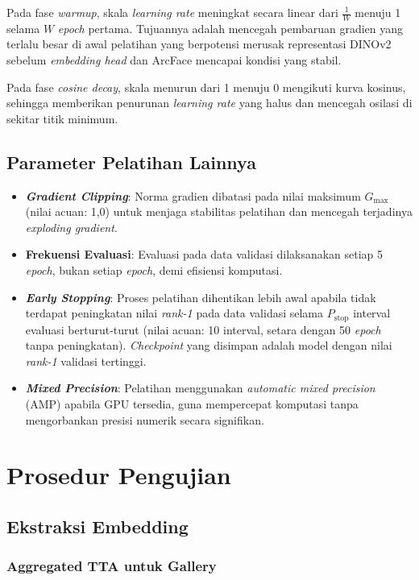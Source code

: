 Pada fase \textit{warmup}, skala \textit{learning rate} meningkat secara linear dari $\frac{1}{W}$ menuju 1 selama $W$ \textit{epoch} pertama. Tujuannya adalah mencegah pembaruan gradien yang terlalu besar di awal pelatihan yang berpotensi merusak representasi DINOv2 sebelum \textit{embedding head} dan ArcFace mencapai kondisi yang stabil.

Pada fase \textit{cosine decay}, skala menurun dari 1 menuju 0 mengikuti kurva kosinus, sehingga memberikan penurunan \textit{learning rate} yang halus dan mencegah osilasi di sekitar titik minimum.

\subsection{Parameter Pelatihan Lainnya}

\begin{itemize}
    \item \textbf{\textit{Gradient Clipping}}: Norma gradien dibatasi pada nilai maksimum $G_{\max}$ (nilai acuan: 1,0) untuk menjaga stabilitas pelatihan dan mencegah terjadinya \textit{exploding gradient}.
    \item \textbf{Frekuensi Evaluasi}: Evaluasi pada data validasi dilaksanakan setiap 5 \textit{epoch}, bukan setiap \textit{epoch}, demi efisiensi komputasi.
    \item \textbf{\textit{Early Stopping}}: Proses pelatihan dihentikan lebih awal apabila tidak terdapat peningkatan nilai \textit{rank-1} pada data validasi selama $P_{\text{stop}}$ interval evaluasi berturut-turut (nilai acuan: 10 interval, setara dengan 50 \textit{epoch} tanpa peningkatan). \textit{Checkpoint} yang disimpan adalah model dengan nilai \textit{rank-1} validasi tertinggi.
    \item \textbf{\textit{Mixed Precision}}: Pelatihan menggunakan \textit{automatic mixed precision} (AMP) apabila GPU tersedia, guna mempercepat komputasi tanpa mengorbankan presisi numerik secara signifikan.
\end{itemize}

\section{Prosedur Pengujian}
\subsection{Ekstraksi Embedding}
\subsubsection{Aggregated TTA untuk Gallery}

